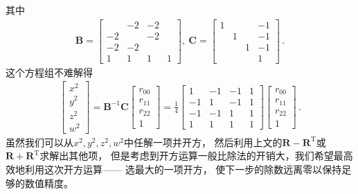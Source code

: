 其中
\begin{align}
    \bm B=\left[\begin{array}{rrrr}
               & -2 & -2 &   \\
            -2 &    & -2 &   \\
            -2 & -2 &    &   \\
            1  & 1  & 1  & 1
        \end{array}\right],\
    \bm C=\left[\begin{array}{rrrr}
            1 &   &   & -1 \\
              & 1 &   & -1 \\
              &   & 1 & -1 \\
              &   &   & 1
        \end{array}\right]\, .
\end{align}
这个方程组不难解得
\begin{align}\label{eq:02ex.2}
    \left[\begin{array}{c}
            x^2 \\y^2\\z^2\\w^2
        \end{array}\right]=\bm B^{-1}\bm C\left[\begin{array}{c}
            r_{00} \\r_{11}\\r_{22}\\1
        \end{array}\right]=\frac{1}{4}\left[\begin{array}{rrrr}
            1  & -1 & -1 & 1 \\
            -1 & 1  & -1 & 1 \\
            -1 & -1 & 1  & 1 \\
            1  & 1  & 1  & 1
        \end{array}\right]\left[\begin{array}{c}
            r_{00} \\r_{11}\\r_{22}\\1
        \end{array}\right]\, .
\end{align}
虽然我们可以从$x^2,y^2,z^2,w^2$中任解一项并开方，
然后利用上文的$\bm R-\bm R^\mathrm{T}$或$\bm R+\bm R^\mathrm{T}$求解出其他项，
但是考虑到开方运算一般比除法的开销大，我们希望最高效地利用这次开方运算——
选最大的一项开方，
使下一步的除数远离零以保持足够的数值精度。
